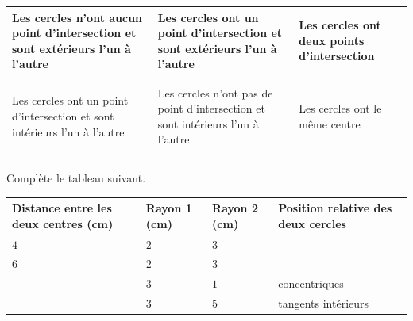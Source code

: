 \documentclass[../math2.tex]{subfiles}
\begin{document}
\tikzexternaldisable
{\renewcommand{\arraystretch}{2.7}
  \begin{tabularx}{\linewidth}{|Y|Y|Y|}
    \hline
    Les cercles n'ont aucun point d'intersection et sont extérieurs l'un à l'autre & Les cercles ont un point d'intersection et sont extérieurs l'un à l'autre       & Les cercles ont deux points d'intersection \\
    \hline
                                                &                                               &         \\
    \hline
                                                                                   &                                                                                 &                                            \\
    \hline
    \hline
    Les cercles ont un point d'intersection et sont intérieurs l'un à l'autre      & Les cercles n'ont pas de point d'intersection et sont intérieurs l'un à l'autre & Les cercles ont le même centre             \\
    \hline
                                                 &                                               &   \\
    \hline
                                                                                   &                                                                                 &                                            \\
    \hline
  \end{tabularx}}
  \tikzexternalenable

\newpage
\begin{exercise}
  Complète le tableau suivant. \\

  {\renewcommand{\arraystretch}{1.7}
  \begin{tabularx}{\linewidth}{|X|X|X|X|}
    \hline
    \textbf{Distance entre les deux centres (cm)} & \textbf{Rayon 1 (cm)} & \textbf{Rayon 2 (cm)} & \textbf{Position relative des deux cercles} \\
    \hline
    $4$                                           & $2$                   & $3$                   &                                             \\
    \hline
    $6$                                           & $2$                   & $3$                   &                                             \\
    \hline
                                                  & $3$                   & $1$                   & concentriques                               \\
    \hline
                                                  & $3$                   & $5$                   & tangents intérieurs                         \\
    \hline
  \end{tabularx}}
\end{exercise}
\end{document}

